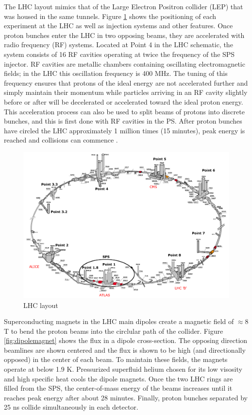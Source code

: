 The LHC layout mimics that of the Large Electron Positron collider (LEP) that was housed in the same tunnels. Figure \ref{fig:LHClayout} shows the positioning of each experiment at the LHC as well as injection systems and other features. Once proton bunches enter the LHC in two opposing beams, they are accelerated with radio frequency (RF) systems. Located at Point 4 in the LHC schematic, the system consists of 16 RF cavities operating at twice the frequency of the SPS injector. RF cavities are metallic chambers containing oscillating electromagnetic fields; in the LHC this oscillation frequency is 400 MHz. The tuning of this frequency ensures that protons of the ideal energy are not accelerated further and simply maintain their momentum while particles arriving in an RF cavity slightly before or after will be decelerated or accelerated toward the ideal proton energy. This acceleration process can also be used to split beams of protons into discrete bunches, and this is first done with RF cavities in the PS. After proton bunches have circled the LHC approximately 1 million times (15 minutes), peak energy is reached and collisions can commence \cite{radiofrequency}.

\begin{figure}[!h]
        \centering
    \includegraphics[width=.6\textwidth]{Pictures/LHClayout.PNG}
    \caption{LHC layout \cite{LHCref}}
    \label{fig:LHClayout}
\end{figure}

Superconducting magnets in the LHC main dipoles create a magnetic field of $\approx 8$ T to bend the proton beams into the circlular path of the collider. Figure \ref{fig:dipolemagnet} shows the flux in a dipole cross-section. The opposing direction beamlines are shown centered and the flux is shown to be high (and directionally opposed) in the center of each beam. To maintain these fields, the magnets operate at below 1.9 K. Pressurized superfluid helium chosen for its low visosity and high specific heat cools the dipole magnets. Once the two LHC rings are filled from the SPS, the center-of-mass energy of the beams increases until it reaches peak energy after about 28 minutes. Finally, proton bunches separated by 25 ns collide simultaneously in each detector.  

